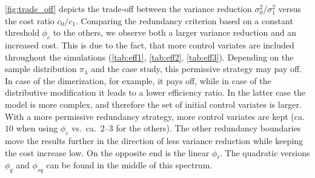 \autoref{fig:trade_off} depicts the trade-off between the variance reduction $\sigma_0^2/\sigma_1^2$
versus the cost ratio $c_0/c_1$. Comparing the redundancy criterion based on a constant threshold
$\phi_c$ to the others,
we observe both a larger variance reduction and an increased cost. This is due to the fact, that
more control  variates are included throughout the simulations (\autoref{tab:eff1}, \autoref{tab:eff2}, \autoref{tab:eff3}). Depending on the sample distribution $\pi_{\lambda}$
and the case study, this permissive strategy may pay off. In case of the dimerization, for example,
it pays off, while in case of the distributive modification it leads to a lower efficiency ratio.
In the latter case the model is more complex, and therefore the set of initial
control  variates is larger. With a more permissive redundancy strategy, more control  variates are kept
(ca.\ $10$ when using $\phi_c$ vs.\ ca.\ \numrange{2}{3} for the others).
The other redundancy boundaries move the results further in the direction of less variance reduction
while keeping the cost increase low.
On the opposite end is the linear $\phi_{\ell}$.
The quadratic versions $\phi_{q}$ and $\phi_{\mathit{sq}}$ can be found in the middle of this spectrum.
